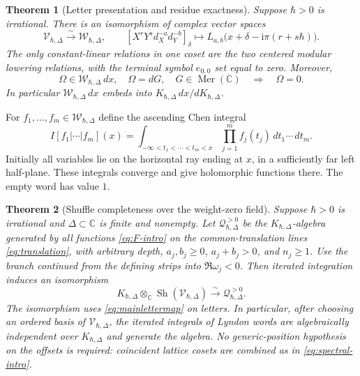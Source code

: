 \documentclass[11pt]{article}
\numberwithin{equation}{section}
\newtheorem{theorem}{Theorem}[section]
\theoremstyle{definition}
\theoremstyle{remark}
\newcommand{\C}{\mathbb C}
\newcommand{\dd}{\,d}
\newcommand{\ii}{\mathrm i}
\newcommand{\Mer}{\operatorname{Mer}}
\newcommand{\Sh}{\operatorname{Sh}}
\newcommand{\calW}{\mathcal W}
\newcommand{\calV}{\mathcal V}
\newcommand{\calQ}{\mathcal Q}
\newcommand{\qh}{\hbar}
\begin{document}
\begin{theorem}[Letter presentation and residue exactness]\label{thm:mainletters}
Suppose $\qh>0$ is irrational. There is an isomorphism of complex vector spaces
\begin{equation}\label{eq:mainlettermap}
 \calV_{\qh,\Delta}\xrightarrow{\sim}\calW_{\qh,\Delta},\qquad
 \left[X^rY^s d_X^{-a}d_Y^{-b}\right]_{\delta}
 \longmapsto L_{a,b}\bigl(x+\delta-\ii\pi(r+s\qh)\bigr).
\end{equation}
The only constant-linear relations in one coset are the two centered
modular lowering relations, with the terminal symbol $e_{0,0}$ set equal to
zero. Moreover,
\begin{equation}\label{eq:mainexactness}
 \Omega\in\calW_{\qh,\Delta}\dd x,\quad
 \Omega=dG,\quad G\in\Mer(\C)
 \quad\Longrightarrow\quad \Omega=0.
\end{equation}
In particular $\calW_{\qh,\Delta}\dd x$ embeds into
$K_{\qh,\Delta}\dd x/dK_{\qh,\Delta}$.
\end{theorem}

For $f_1,\ldots,f_m\in\calW_{\qh,\Delta}$ define the ascending Chen integral
\begin{equation}\label{eq:Chen-intro}
 I[f_1|\cdots|f_m](x)
 =\int_{-\infty<t_1<\cdots<t_m<x}
 \prod_{j=1}^m f_j(t_j)\dd t_1\cdots\dd t_m.
\end{equation}
Initially all variables lie on the horizontal ray ending at $x$, in a
sufficiently far left half-plane. These integrals converge and give holomorphic
functions there. The empty word has value $1$.

\begin{theorem}[Shuffle completeness over the weight-zero field]\label{thm:mainshuffle}
Suppose $\qh>0$ is irrational and $\Delta\subset\C$ is finite and nonempty. Let
$\calQ_{\qh,\Delta}^{>0}$ be the $K_{\qh,\Delta}$-algebra generated by all
functions \eqref{eq:F-intro} on the common-translation lines
\eqref{eq:translation}, with arbitrary depth, $a_j,b_j\geq0$,
$a_j+b_j>0$, and $n_j\geq1$. Use the branch continued from the defining
strips into $\Re\omega_j<0$.
Then iterated integration induces an isomorphism
\begin{equation}\label{eq:mainshuffle}
 K_{\qh,\Delta}\otimes_{\C}\Sh(\calV_{\qh,\Delta})
 \xrightarrow{\sim}\calQ_{\qh,\Delta}^{>0}.
\end{equation}
The isomorphism uses \eqref{eq:mainlettermap} on letters. In particular, after
choosing an ordered basis of $\calV_{\qh,\Delta}$, the iterated integrals of
Lyndon words are algebraically independent over $K_{\qh,\Delta}$ and generate
the algebra. No generic-position hypothesis on the offsets is required:
coincident lattice cosets are combined as in \eqref{eq:spectral-intro}.
\end{theorem}
\end{document}
